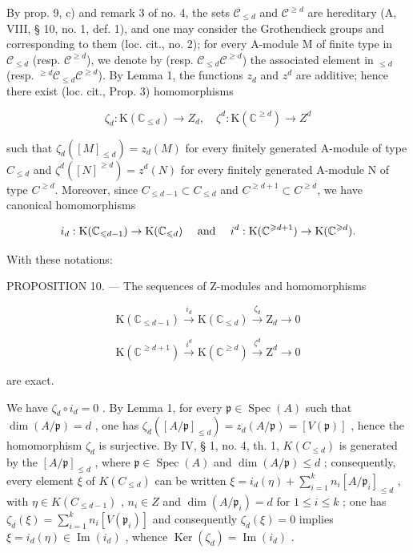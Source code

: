 By prop. 9, c) and remark 3 of no. 4, the sets \(\mathcal{C}_{\leq d}\) and \(\mathcal{C}^{\geq d}\) are hereditary (A, VIII, § 10, no. 1, def. 1), and one may consider the Grothendieck groups  and  corresponding to them (loc. cit., no. 2); for every A-module M of finite type in \(\mathcal{C}_{\leq d}\) (resp. \(\mathcal{C}^{\geq d}\)), we denote by  (resp. \(\mathcal{C}_{\leq d}\)\(\mathcal{C}^{\geq d}\){) the associated element in }{}\(_{\leq d}\) (resp. {}{}\(^{\geq d}\)\(\mathcal{C}_{\leq d}\)\(\mathcal{C}^{\geq d}\)). By Lemma 1, the functions \(z_{d}\) and \(z^{d}\) are additive; hence there exist (loc. cit., Prop. 3) homomorphisms

\[
\zeta_ {d}: \mathrm{K} (\mathbb {C} _ {\leqslant d}) \rightarrow Z _ {d}, \quad \zeta^ {d}: \mathrm{K} (\mathbb {C} ^ {\geqslant d}) \rightarrow Z ^ {d}
\]

such that \(\zeta_d([M]_{\leq d}) = z_d(M)\) for every finitely generated A-module of type \(C_{\leq d}\) and \(\zeta^d ([N]^{\geq d}) = z^d (N)\) for every finitely generated A-module N of type \(C^{\geq d}\). Moreover, since \(C_{\leq d-1} \subset C_{\leq d}\) and \(C^{\geq d+1} \subset C^{\geq d}\), we have canonical homomorphisms

\[
i _ {d}: \mathrm{K} (\mathbb {C} _ {\leqslant d - 1}) \rightarrow \mathrm{K} (\mathbb {C} _ {\leqslant d}) \quad \text {\text{ and }} \quad i ^ {d}: \mathrm{K} (\mathbb {C} ^ {\geqslant d + 1}) \rightarrow \mathrm{K} (\mathbb {C} ^ {\geqslant d}).
\]

With these notations:

PROPOSITION 10. --- The sequences of Z-modules and homomorphisms

\[
\mathrm{K} \left(\mathbb {C} _ {\leqslant d - 1}\right) \xrightarrow {i _ {d}} \mathrm{K} \left(\mathbb {C} _ {\leqslant d}\right) \xrightarrow {\zeta_ {d}} \mathrm{Z} _ {d} \longrightarrow 0
\]

\[
\mathrm{K} \left(\mathbb {C} ^ {\geqslant d + 1}\right) \xrightarrow {i ^ {d}} \mathrm{K} \left(\mathbb {C} ^ {\geqslant d}\right) \xrightarrow {\zeta ^ {d}} \mathrm{Z} ^ {d} \longrightarrow 0
\]

are exact.

We have \(\zeta_d \circ i_d = 0\) . By Lemma 1, for every \(\mathfrak{p} \in \operatorname{Spec}(A)\) such that \(\dim(A/\mathfrak{p}) = d\) , one has \(\zeta_d([A/\mathfrak{p}]_{\leq d}) = z_d(A/\mathfrak{p}) = [V(\mathfrak{p})]\) , hence the homomorphism \(\zeta_d\) is surjective. By IV, § 1, no. 4, th. 1, \(K(C_{\leq d})\) is generated by the \([A/\mathfrak{p}]_{\leq d}\) , where \(\mathfrak{p} \in \operatorname{Spec}(A)\) and \(\dim(A/\mathfrak{p}) \leqslant d\) ; consequently, every element \(\xi\) of \(K(C_{\leq d})\) can be written \(\xi = i_d(\eta) + \sum_{i=1}^{k} n_i[A/\mathfrak{p}_i]_{\leq d}\) , with \(\eta \in K(C_{\leq d-1})\) , \(n_i \in Z\) and \(\dim(A/\mathfrak{p}_i) = d\) for \(1 \leqslant i \leqslant k\) ; one has \(\zeta_d(\xi) = \sum_{i=1}^{k} n_i[V(\mathfrak{p}_i)]\) and consequently \(\zeta_d(\xi) = 0\) implies \(\xi = i_d(\eta) \in \operatorname{Im}(i_d)\) , whence \(\operatorname{Ker}(\zeta_d) = \operatorname{Im}(i_d)\) .

